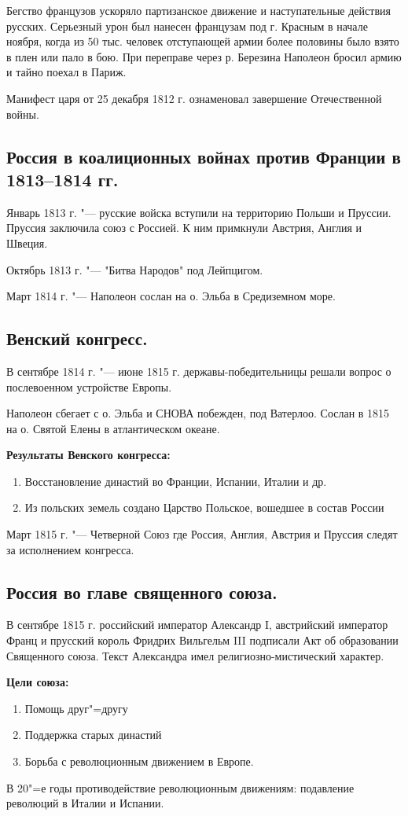 Бегство французов ускоряло партизанское движение и наступательные действия русских. Серьезный урон был нанесен французам под г. Красным в начале ноября, когда из 50 тыс. человек отступающей армии более половины было взято в плен или пало в бою.
При переправе через р. Березина Наполеон бросил армию и тайно поехал в Париж.

Манифест царя от 25 декабря 1812 г. ознаменовал завершение Отечественной войны.

\subsection{Россия в коалиционных войнах против Франции в 1813--1814 гг.}

Январь 1813 г. "--- русские войска вступили на территорию Польши и Пруссии. Пруссия заключила союз с Россией. К ним примкнули Австрия, Англия и Швеция.

Октябрь 1813 г. "--- "Битва Народов" под Лейпцигом.

Март 1814 г. "--- Наполеон сослан на о. Эльба в Средиземном море.

\subsection{Венский конгресс.}

В сентябре 1814 г. "--- июне 1815 г. державы-победительницы решали вопрос о послевоенном устройстве Европы.

Наполеон сбегает с о. Эльба и СНОВА побежден, под Ватерлоо. Сослан в 1815 на о. Святой Елены в атлантическом океане.

\textbf{Результаты Венского конгресса:}

\begin{enumerate}
    \item{ Восстановление династий во Франции, Испании, Италии и др. }
    \item{ Из польских земель создано Царство Польское, вошедшее в состав России }
\end{enumerate}

Март 1815 г. "--- Четверной Союз где Россия, Англия, Австрия и Пруссия следят за исполнением конгресса.

\subsection{Россия во главе священного союза.}

В сентябре 1815 г. российский император Александр I, австрийский император Франц и прусский король Фридрих Вильгельм III подписали Акт об образовании Священного союза. Текст Александра имел религиозно-мистический характер.

\textbf{Цели союза:}

\begin{enumerate}
    \item{ Помощь друг"=другу }
    \item{ Поддержка старых династий  }
    \item{ Борьба с революционным движением в Европе. }
\end{enumerate}

В 20"=е годы противодействие революционным движениям: подавление революций в Италии и Испании.
